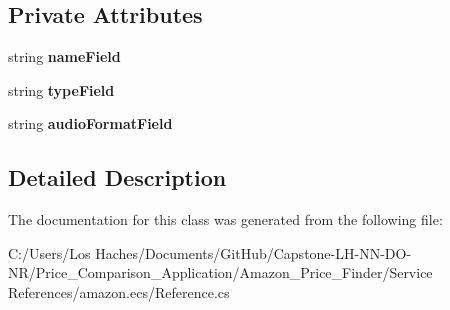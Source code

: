 \subsection*{Private Attributes}
\begin{DoxyCompactItemize}
\item 
\hypertarget{class_price___comparison_1_1amazon_1_1ecs_1_1_item_attributes_language_a9d71faab50de3db98db35b77b91501ca}{string {\bfseries name\-Field}}\label{class_price___comparison_1_1amazon_1_1ecs_1_1_item_attributes_language_a9d71faab50de3db98db35b77b91501ca}

\item 
\hypertarget{class_price___comparison_1_1amazon_1_1ecs_1_1_item_attributes_language_a6acf8b72e38b1998e09ba720319d7ab4}{string {\bfseries type\-Field}}\label{class_price___comparison_1_1amazon_1_1ecs_1_1_item_attributes_language_a6acf8b72e38b1998e09ba720319d7ab4}

\item 
\hypertarget{class_price___comparison_1_1amazon_1_1ecs_1_1_item_attributes_language_a3588a5e55e4a0a4c187d36a3998228ed}{string {\bfseries audio\-Format\-Field}}\label{class_price___comparison_1_1amazon_1_1ecs_1_1_item_attributes_language_a3588a5e55e4a0a4c187d36a3998228ed}

\end{DoxyCompactItemize}


\subsection{Detailed Description}


The documentation for this class was generated from the following file\-:\begin{DoxyCompactItemize}
\item 
C\-:/\-Users/\-Los Haches/\-Documents/\-Git\-Hub/\-Capstone-\/\-L\-H-\/\-N\-N-\/\-D\-O-\/\-N\-R/\-Price\-\_\-\-Comparison\-\_\-\-Application/\-Amazon\-\_\-\-Price\-\_\-\-Finder/\-Service References/amazon.\-ecs/Reference.\-cs\end{DoxyCompactItemize}
